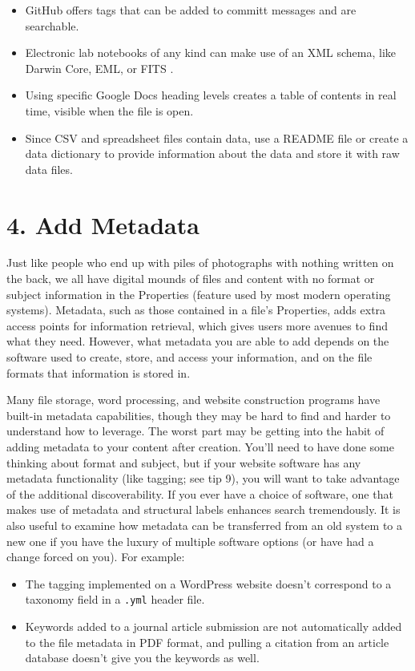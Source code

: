 \documentclass[10pt,letterpaper]{article}
\newcommand{\rulemajor}[1]{\section*{#1}}
\begin{document}
\begin{itemize}
\item
  GitHub offers tags that can be added to committ messages and are searchable.
\item
  Electronic lab notebooks of any kind can make use of an XML schema,
  like Darwin Core, EML, or FITS \cite{Briney2015}.
\item
  Using specific Google Docs heading levels creates a table of contents in real time,
  visible when the file is open.
\item
  Since CSV and spreadsheet files contain data,
  use a README file or create a data dictionary to provide information
  about the data and store it with raw data files.
\end{itemize}

\rulemajor{4. Add Metadata}

Just like people who end up with piles of photographs with nothing
written on the back, we all have digital mounds of files and content
with no format or subject information in the Properties (feature used by
most modern operating systems). Metadata, such as those contained in a
file's Properties, adds extra access points for information retrieval,
which gives users more avenues to find what they need. However, what
metadata you are able to add depends on the software used to create,
store, and access your information, and on the file formats that
information is stored in.

Many file storage, word processing, and website construction programs
have built-in metadata capabilities, though they may be hard to find and
harder to understand how to leverage. The worst part may be getting into
the habit of adding metadata to your content after creation. You'll need
to have done some thinking about format and subject, but if your website
software has any metadata functionality (like tagging; see tip 9), you
will want to take advantage of the additional discoverability. If you
ever have a choice of software, one that makes use of metadata and
structural labels enhances search tremendously. It is also useful to
examine how metadata can be transferred from an old system to a new one
if you have the luxury of multiple software options (or have had a
change forced on you).
For example:

\begin{itemize}
\item
  The tagging implemented on a WordPress website doesn't
  correspond to a taxonomy field in a \texttt{.yml} header file.
\item
  Keywords added to a journal article submission are not automatically
  added to the file metadata in PDF format, and pulling a citation from an
  article database doesn't give you the keywords as well.
\end{itemize}
\end{document}
